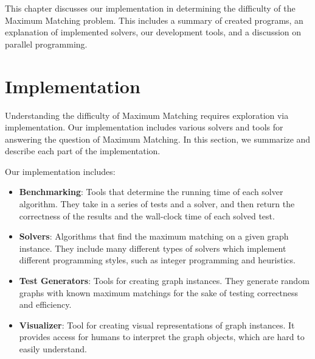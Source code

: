 
This chapter discusses our implementation in determining the difficulty of 
the Maximum Matching problem. This includes a summary of created programs,
an explanation of implemented solvers, our development tools, and a 
discussion on parallel programming. 

\section{Implementation}
Understanding the difficulty of Maximum Matching requires exploration via 
implementation. Our implementation includes various solvers and tools for answering
the question of Maximum Matching. In this section, we summarize and describe
each part of the implementation. 

Our implementation includes:
\begin{itemize}
	\item \textbf{Benchmarking}: Tools that determine the running time of 
    each solver algorithm. They take in a series of tests and a solver, and then
    return the correctness of the results and the wall-clock time of each solved test.
	\item \textbf{Solvers}: Algorithms that find the maximum matching on a given
    graph instance. They include many different types of solvers which implement
    different programming styles, such as integer programming and heuristics. 
	\item \textbf{Test Generators}: Tools for creating graph instances. They 
    generate random graphs with known maximum matchings for the sake of testing 
    correctness and efficiency. 
	\item \textbf{Visualizer}: Tool for creating visual representations of
    graph instances. It provides access for humans to interpret the graph objects,
    which are hard to easily understand. 
\end{itemize}

